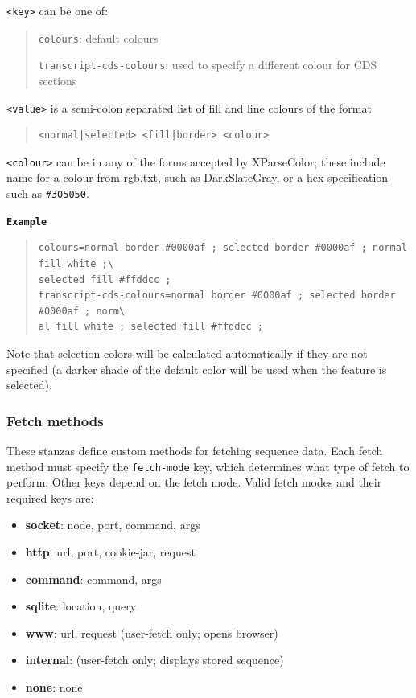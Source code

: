 \documentclass[letterpaper]{article}
\newcommand\textstyleSourceText[1]{\texttt{#1}}
\newcommand\liststyleLii{%
\renewcommand\labelitemi{{\textbullet}}
\renewcommand\labelitemii{{\textbullet}}
\renewcommand\labelitemiii{{\textbullet}}
\renewcommand\labelitemiv{{\textbullet}}
}
\begin{document}
\texttt{{\textless}key{\textgreater}} can be one of:
\begin{quote}
\texttt{colours}: default colours

\texttt{transcript-cds-colours}: used to specify a different colour for CDS sections
\end{quote}

\bigskip

\texttt{{\textless}value{\textgreater}} is a semi-colon separated list of fill and line colours of the format

\begin{quote}
\begin{verbatim}
<normal|selected> <fill|border> <colour>
\end{verbatim}
\end{quote}

\texttt{{\textless}colour{\textgreater}} can be in any of the forms accepted by XParseColor; these include name for a colour from rgb.txt, such as DarkSlateGray, or a hex specification such as \texttt{\#305050}.

\bigskip

{\textstyleSourceText{\textrm{\textbf{Example}}}\textbf{}}
\begin{quote}
\begin{verbatim}
colours=normal border #0000af ; selected border #0000af ; normal fill white ;\
selected fill #ffddcc ; 
transcript-cds-colours=normal border #0000af ; selected border #0000af ; norm\
al fill white ; selected fill #ffddcc ;
\end{verbatim}
\end{quote}

Note that selection colors will be calculated automatically if they are not specified (a darker shade of the default color will be used when the feature is selected).

{\color[rgb]{0.30980393,0.5058824,0.7411765}\subsubsection[Fetch methods ]{Fetch methods }}
\label{section:fetch-methods}
{These stanzas define custom methods for fetching sequence data. Each
fetch method must specify the \textstyleSourceText{fetch-mode} key,
which determines what type of fetch to perform. Other keys depend on
the fetch mode. Valid fetch modes and their required keys are: }

\liststyleLii
\begin{itemize}
\item {\ttfamily\textbf{socket}: node, port, command, args }
\item {\ttfamily\textbf{http}: url, port, cookie-jar, request }
\item {\ttfamily\textbf{command}: command, args }
\item {\ttfamily\textbf{sqlite}: location, query }
\item {\ttfamily\textbf{www}: url, request (user-fetch only; opens browser) }
\item {\ttfamily\textbf{internal}: (user-fetch only; displays stored sequence) }
\item {\ttfamily\textbf{none}: none }
\end{itemize}
\end{document}
